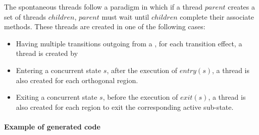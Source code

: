 The spontaneous threads follow a paradigm in which if a thread $parent$ creates a set of threads $children$, $parent$ must wait until $children$ complete their associate methods. These threads are created in one of the following cases:

\begin{itemize}
	\item Having multiple transitions outgoing from a , for each transition effect, a thread is created by 
	
	\item Entering a concurrent state $s$, after the execution of $entry(s)$, a thread is also created for each orthogonal region. 
	
	\item Exiting a concurrent state $s$, before the execution of $exit(s)$, a thread is also created for each region to exit the corresponding active sub-state. 
\end{itemize}

\paragraph{Example of generated code}

 


 

